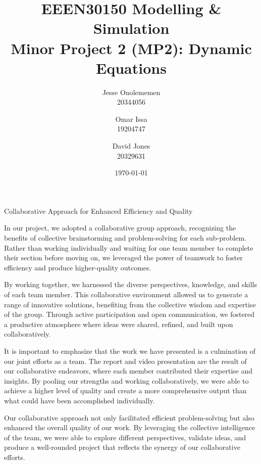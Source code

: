 \documentclass[11pt,a4paper,oneside]{report}
\author{
  Jesse Onolememen\\
  20344056
  \and
  Omar Issa\\
  19204747
  \and
  David Jones\\
  20329631
}
\title{
  \textbf{EEEN30150 Modelling \& Simulation} \\
  \large Minor Project 2 (MP2): Dynamic Equations}
\date{\today}
\numberwithin{equation}{section}
\begin{document}
\maketitle



\newpage
\setlength{\cftsubsecindent}{1.5cm}
\setlength{\cftsubsubsecindent}{1.5cm}
\doublespacing
\tableofcontents
\onehalfspacing










Collaborative Approach for Enhanced Efficiency and Quality

In our project, we adopted a collaborative group approach, recognizing the benefits of collective brainstorming and problem-solving for each sub-problem. Rather than working individually and waiting for one team member to complete their section before moving on, we leveraged the power of teamwork to foster efficiency and produce higher-quality outcomes.

By working together, we harnessed the diverse perspectives, knowledge, and skills of each team member. This collaborative environment allowed us to generate a range of innovative solutions, benefiting from the collective wisdom and expertise of the group. Through active participation and open communication, we fostered a productive atmosphere where ideas were shared, refined, and built upon collaboratively.

It is important to emphasize that the work we have presented is a culmination of our joint efforts as a team. The report and video presentation are the result of our collaborative endeavors, where each member contributed their expertise and insights. By pooling our strengths and working collaboratively, we were able to achieve a higher level of quality and create a more comprehensive output than what could have been accomplished individually.

Our collaborative approach not only facilitated efficient problem-solving but also enhanced the overall quality of our work. By leveraging the collective intelligence of the team, we were able to explore different perspectives, validate ideas, and produce a well-rounded project that reflects the synergy of our collaborative efforts.


\end{document}
